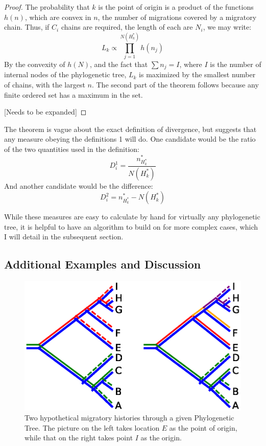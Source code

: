 \documentclass[11pt]{article}
\begin{document}
{\begin{proof}
The probability that $k$ is the point of origin is a product of the functions $h(n)$, which are convex in $n$,  the number of migrations covered by a migratory chain. Thus, if $C_i$ chains are required, the length of each are $N_i$, we may write:
\begin{equation*}
L_k \propto\prod_{j=1}^{N(H^*_k)} h(n_j)
\end{equation*} 
By the convexity of $h(N)$, and the fact that $\sum n_j=I$, where $I$ is the number of internal nodes of the phylogenetic tree, $L_k$ is maximized by the smallest number of chains, with the largest $n$. The second part of the theorem follows because any finite ordered set has a maximum in the set.

[Needs to be expanded]
  
\end{proof} 

The theorem is vague about the exact definition of divergence, but suggests that any measure obeying the definitions 1 will do. One candidate would be the ratio of the two quantities used in the definition:
\begin{equation*}
D^1_i=\frac{n^*_{H^*_k}}{N(H^*_k)}
\end{equation*}
And another candidate would be the difference:
\begin{equation*}
D^2_i=n^*_{H^*_k}-N(H^*_k)
\end{equation*}



While these measures are easy to calculate by hand for virtually any phylogenetic tree, it is helpful to have an algorithm to build on for more complex cases, which I will detail in the subsequent section.  

\subsection{Additional Examples and Discussion}

 
\begin{figure}
\begin{center}
\includegraphics[width=\textwidth]{AncillaryFiles//example1.eps}
\caption{Two hypothetical migratory histories through a given Phylogenetic Tree. The picture on the left takes location $E$ as the point of origin, while that on the right takes point $I$ as the origin. } \label{ex1}
\end{center} 
\end{figure}

}
\end{document}
